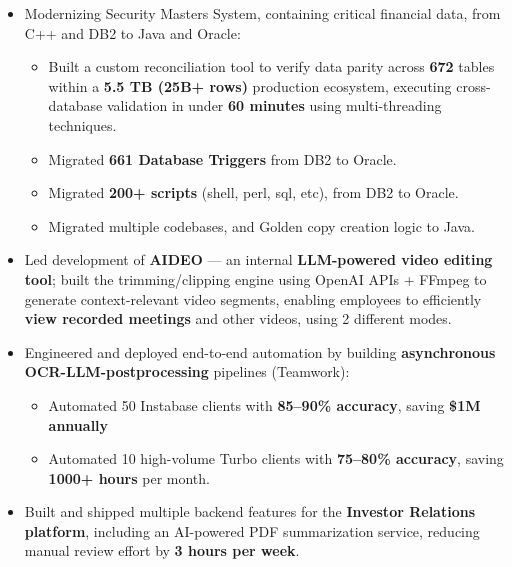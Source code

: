 \documentclass[a4paper,10pt]{article}
\newenvironment{zitemize}{
\begin{itemize}\itemsep0pt \parskip0pt \parsep1pt}
{\end{itemize}\vspace{-0.7cm}}
\begin{document}
\begin{zitemize}
\item Modernizing Security Masters System, containing critical financial data, from C++ and DB2 to Java and Oracle: \vspace{-2pt}
\begin{itemize}
    \setlength{\itemsep}{-1pt}
    \setlength{\parsep}{0pt}
    \setlength{\topsep}{10pt}
    \setlength{\partopsep}{0pt}
    \item[-] Built a custom reconciliation tool to verify data parity across \textbf{672} tables within a \textbf{5.5 TB (25B+ rows)} production ecosystem, executing cross-database validation in under \textbf{60 minutes}  using multi-threading techniques.
    \item[-] Migrated \textbf{661 Database Triggers} from DB2 to Oracle.
    \item[-] Migrated \textbf{200+ scripts} (shell, perl, sql, etc), from DB2 to Oracle.
    \item[-] Migrated multiple codebases, and Golden copy creation logic to Java.
\end{itemize}

\item Led development of \textbf{AIDEO} — an internal \textbf{LLM-powered video editing tool}; built the trimming/clipping engine using OpenAI APIs + FFmpeg to generate context-relevant video segments, enabling employees to efficiently \textbf{view recorded meetings} and other videos, using 2 different modes.

\item Engineered and deployed end-to-end automation by building \textbf{asynchronous OCR-LLM-postprocessing} pipelines (Teamwork): \vspace{-0.15cm}
\begin{itemize}
    \item[-] Automated 50 Instabase clients with \textbf{85--90\% accuracy}, saving \textbf{\$1M annually}  \vspace{-0.15cm}
    \item[-] Automated 10 high-volume Turbo clients with \textbf{75--80\% accuracy}, saving \textbf{1000+ hours} per month. \vspace{-0.10cm}
\end{itemize}
\item Built and shipped multiple backend features for the \textbf{Investor Relations platform}, including an AI-powered PDF summarization service, reducing manual review effort by \textbf{3 hours per week}.


\end{zitemize}
\end{document}
